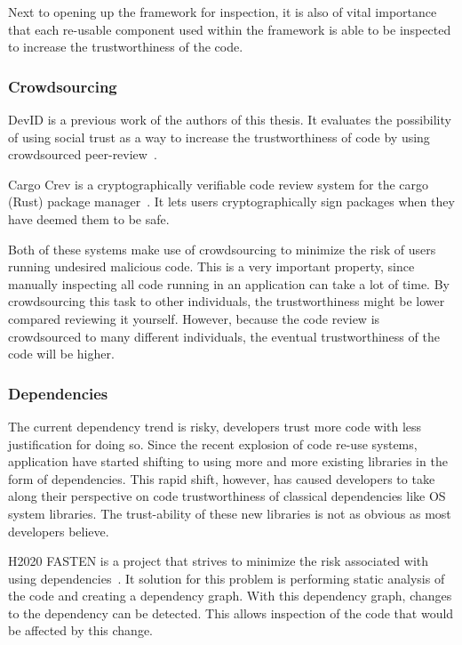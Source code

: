 Next to opening up the framework for inspection, it is also of vital importance that each re-usable component used within the framework is able to be inspected to increase the trustworthiness of the code.

\subsubsection{\textbf{Crowdsourcing}}
DevID is a previous work of the authors of this thesis. It evaluates the possibility of using social trust as a way to increase the trustworthiness of code by using crowdsourced peer-review~\cite{de2019devid}.

Cargo Crev is a cryptographically verifiable code review system for the cargo (Rust) package manager~\cite{cargocrev}. It lets users cryptographically sign packages when they have deemed them to be safe.

Both of these systems make use of crowdsourcing to minimize the risk of users running undesired malicious code. This is a very important property, since manually inspecting all code running in an application can take a lot of time. By crowdsourcing this task to other individuals, the trustworthiness might be lower compared reviewing it yourself. However, because the code review is crowdsourced to many different individuals, the eventual trustworthiness of the code will be higher.  

\subsubsection{\textbf{Dependencies}}
The current dependency trend is risky, developers trust more code with less justification for doing so. Since the recent explosion of code re-use systems, application have started shifting to using more and more existing libraries in the form of dependencies. This rapid shift, however, has caused developers to take along their perspective on code trustworthiness of classical dependencies like OS system libraries. The trust-ability of these new libraries is not as obvious as most developers believe.

H2020 FASTEN is a project that strives to minimize the risk associated with using dependencies~\cite{fasten}. It solution for this problem is performing static analysis of the code and creating a dependency graph. With this dependency graph, changes to the dependency can be detected. This allows inspection of the code that would be affected by this change.

